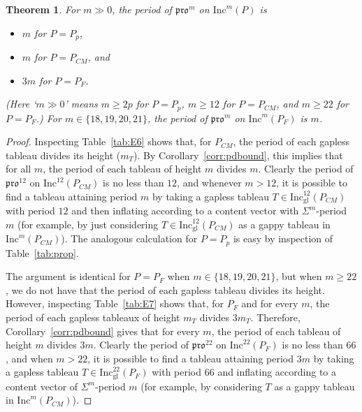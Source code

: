 \documentclass[12pt]{amsart}
\newtheorem{theorem}{Theorem}[section]
\theoremstyle{definition}
\theoremstyle{remark}
\numberwithin{equation}{section}
\newcommand{\inc}{\ensuremath{\mathrm{Inc}}}
\newcommand{\incgl}{\inc_{\mathrm{gl}}}
\newcommand{\pro}{\mathfrak{pro}}
\begin{document}
\begin{theorem}\label{thm:actualpdbound}
For $m \gg 0$, the period of $\pro^m$ on $\inc^m(P)$ is 
\begin{itemize}
\item $m$ for $P = P_p$, 
\item $m$ for $P = P_{CM}$, and 
\item $3m$ for $P = P_F$. 
\end{itemize}
(Here `$m \gg 0$' means $m \geq 2p$ for $P = P_p$, $m \geq 12$ for $P = P_{CM}$, and $m \geq 22$ for $P = P_F$.) For $m \in \lbrace 18,19,20, 21 \rbrace$, the period of $\pro^m$ on $\inc^m(P_F)$ is $m$.
\end{theorem}
\begin{proof}
Inspecting Table~\ref{tab:E6} shows that, for $P_{CM}$, the period of each gapless tableau  divides its height ($m_T$). By Corollary~\ref{corr:pdbound}, this implies that for all $m$, the period of each tableau of height $m$ divides $m$. Clearly the period of $\pro^{12}$ on $\inc^{12}(P_{CM})$ is no less than $12$, and whenever $m> 12$, it is possible to find a tableau attaining period $m$ by taking a gapless tableau $T \in \incgl^{12}(P_{CM})$ with period $12$ and then inflating according to a content vector with $\Sigma^m$-period $m$ (for example, by just considering $T \in \incgl^{12}(P_{CM})$ as a gappy tableau in $\inc^m(P_{CM})$). The analogous calculation for $P = P_p$ is easy by inspection of Table~\ref{tab:prop}.

The argument is identical for $P = P_F$ when $m \in \lbrace 18,19,20, 21 \rbrace$, but when $m \geq 22$, we do not have that the period of each gapless tableau divides its height. However, inspecting Table~\ref{tab:E7} shows that, for $P_F$ and for every $m$, the period of each gapless tableaux of height $m_T$ divides $3m_T$. Therefore, Corollary~\ref{corr:pdbound} gives that for every $m$, the period of each tableau of height $m$ divides $3m$. Clearly the period of $\pro^{22}$ on $\inc^{22}(P_{F})$ is no less than $66$, and when $m > 22$, it is possible to find a tableau attaining period $3m$ by taking a gapless tableau  $T \in \incgl^{22}(P_F)$ with period $66$ and inflating according to a content vector of $\Sigma^m$-period $m$ (for example, by considering $T$ as a gappy tableau in $\inc^m(P_{CM})$).
\end{proof}
\end{document}
